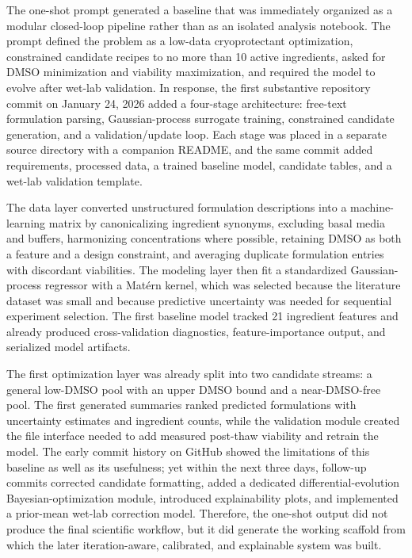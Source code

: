 \documentclass[11pt]{article}
\begin{document}
The one-shot prompt generated a baseline that was immediately organized as a modular closed-loop pipeline rather than as an isolated analysis notebook. The prompt defined the problem as a low-data cryoprotectant optimization, constrained candidate recipes to no more than 10 active ingredients, asked for DMSO minimization and viability maximization, and required the model to evolve after wet-lab validation. In response, the first substantive repository commit on January 24, 2026 added a four-stage architecture: free-text formulation parsing, Gaussian-process surrogate training, constrained candidate generation, and a validation/update loop. Each stage was placed in a separate source directory with a companion README, and the same commit added requirements, processed data, a trained baseline model, candidate tables, and a wet-lab validation template.

The data layer converted unstructured formulation descriptions into a machine-learning matrix by canonicalizing ingredient synonyms, excluding basal media and buffers, harmonizing concentrations where possible, retaining DMSO as both a feature and a design constraint, and averaging duplicate formulation entries with discordant viabilities. The modeling layer then fit a standardized Gaussian-process regressor with a Mat\'{e}rn kernel, which was selected because the literature dataset was small and because predictive uncertainty was needed for sequential experiment selection. The first baseline model tracked 21 ingredient features and already produced cross-validation diagnostics, feature-importance output, and serialized model artifacts.

The first optimization layer was already split into two candidate streams: a general low-DMSO pool with an upper DMSO bound and a near-DMSO-free pool. The first generated summaries ranked predicted formulations with uncertainty estimates and ingredient counts, while the validation module created the file interface needed to add measured post-thaw viability and retrain the model. The early commit history on GitHub showed the limitations of this baseline as well as its usefulness; yet within the next three days, follow-up commits corrected candidate formatting, added a dedicated differential-evolution Bayesian-optimization module, introduced explainability plots, and implemented a prior-mean wet-lab correction model. Therefore, the one-shot output did not produce the final scientific workflow, but it did generate the working scaffold from which the later iteration-aware, calibrated, and explainable system was built.
\end{document}
